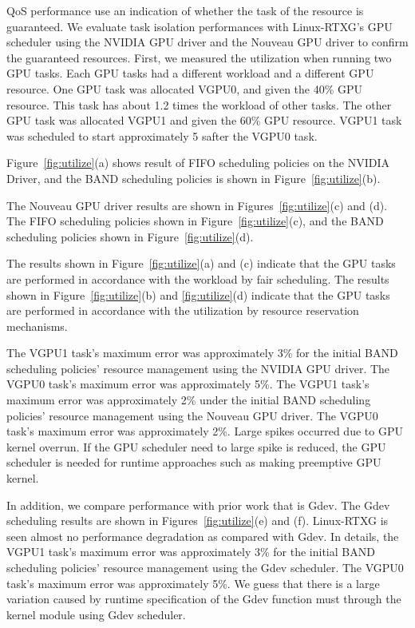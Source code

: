 QoS performance use an indication of whether the task of the resource is guaranteed.
We evaluate task isolation performances with Linux-RTXG's GPU scheduler using the NVIDIA GPU driver and the Nouveau GPU driver to confirm the guaranteed resources.
First, we measured the utilization when running two GPU tasks.
Each GPU tasks had a different workload and a different GPU resource.
One GPU task was allocated VGPU0, and given the 40\% GPU resource.
This task has about 1.2 times the workload of other tasks.
The other GPU task was allocated VGPU1 and given the 60\% GPU resource.
VGPU1 task was scheduled to start approximately 5 safter the VGPU0 task.

Figure~\ref{fig:utilize}(a) shows result of FIFO scheduling policies on the NVIDIA Driver,
and the BAND scheduling policies is shown in Figure~\ref{fig:utilize}(b).

The Nouveau GPU driver results are shown in Figures~\ref{fig:utilize}(c) and (d).
The FIFO scheduling policies shown in Figure~\ref{fig:utilize}(c),
and the BAND scheduling policies shown in Figure~\ref{fig:utilize}(d).

The results shown in Figure~\ref{fig:utilize}(a) and (c) indicate that the GPU tasks are performed in accordance with the workload by fair scheduling.
The results shown in Figure~\ref{fig:utilize}(b) and \ref{fig:utilize}(d) indicate that the GPU tasks are performed in accordance with the utilization by resource reservation mechanisms.

The VGPU1 task's maximum error was approximately 3\% for the initial BAND scheduling policies' resource management using the NVIDIA GPU driver.
The VGPU0 task's maximum error was approximately 5\%.
The VGPU1 task's maximum error was approximately 2\% under the initial BAND scheduling policies' resource management using the Nouveau GPU driver.
The VGPU0 task's maximum error was approximately 2\%.
Large spikes occurred due to GPU kernel overrun.
If the GPU scheduler need to large spike is reduced, the GPU scheduler is needed for runtime approaches such as making preemptive GPU kernel.

In addition, we compare performance with prior work that is Gdev.
The Gdev scheduling results are shown in Figures~\ref{fig:utilize}(e) and (f).
Linux-RTXG is seen almost no performance degradation as compared with Gdev.
In details, the VGPU1 task's maximum error was approximately 3\% for the initial BAND scheduling policies' resource management using the Gdev scheduler.
The VGPU0 task's maximum error was approximately 5\%.
We guess that there is a large variation caused by runtime specification of the Gdev function must through the kernel module using Gdev scheduler.

